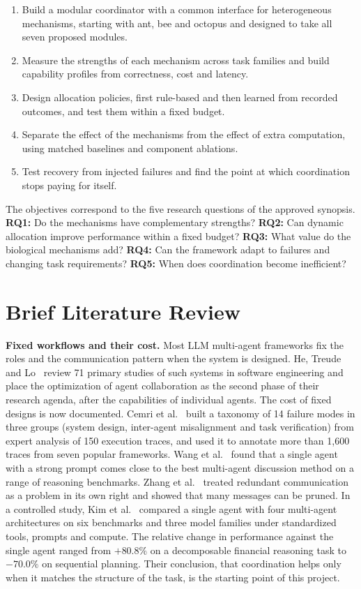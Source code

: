 \documentclass[11pt,a4paper]{article}
\newcommand{\runin}[1]{\textbf{#1}\quad}
\begin{document}
\begin{enumerate}[label=O\arabic*.]
  \item Build a modular coordinator with a common interface for heterogeneous mechanisms, starting with ant,
        bee and octopus and designed to take all seven proposed modules.
  \item Measure the strengths of each mechanism across task families and build capability profiles from
        correctness, cost and latency.
  \item Design allocation policies, first rule-based and then learned from recorded outcomes, and test
        them within a fixed budget.
  \item Separate the effect of the mechanisms from the effect of extra computation, using matched
        baselines and component ablations.
  \item Test recovery from injected failures and find the point at which coordination stops paying for
        itself.
\end{enumerate}

The objectives correspond to the five research questions of the approved synopsis. \textbf{RQ1:} Do the
mechanisms have complementary strengths? \textbf{RQ2:} Can dynamic allocation improve performance within a
fixed budget? \textbf{RQ3:} What value do the biological mechanisms add? \textbf{RQ4:} Can the framework
adapt to failures and changing task requirements? \textbf{RQ5:} When does coordination become inefficient?

\section{Brief Literature Review}
\label{sec:lit}

\runin{Fixed workflows and their cost.}
Most LLM multi-agent frameworks fix the roles and the communication pattern when the system is designed.
He, Treude and Lo~\cite{he2025lma} review 71 primary studies of such systems in software engineering and
place the optimization of agent collaboration as the second phase of their research agenda, after the
capabilities of individual agents. The cost of fixed designs is now documented. Cemri et
al.~\cite{cemri2025mast} built a taxonomy of 14 failure modes in three groups (system design, inter-agent
misalignment and task verification) from expert analysis of 150 execution traces, and used it to annotate
more than 1,600 traces from seven popular frameworks. Wang et al.~\cite{wang2024rethinking} found that a
single agent with a strong prompt comes close to the best multi-agent discussion method on a range of
reasoning benchmarks. Zhang et al.~\cite{zhang2025agentprune} treated redundant communication as a problem
in its own right and showed that many messages can be pruned. In a controlled study, Kim et
al.~\cite{kim2025scaling} compared a single agent with four multi-agent architectures on six benchmarks and
three model families under standardized tools, prompts and compute. The relative change in performance
against the single agent ranged from $+80.8\%$ on a decomposable financial reasoning task to $-70.0\%$ on
sequential planning. Their conclusion, that coordination helps only when it matches the structure of the
task, is the starting point of this project.
\end{document}
